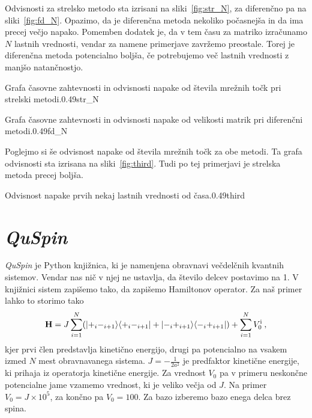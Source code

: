\documentclass{porocilo}
\begin{document}
Odvisnosti za strelsko metodo sta izrisani na sliki~\ref{fig:str_N}, za diferenčno pa na sliki~\ref{fig:fd_N}. Opazimo, da je diferenčna metoda nekoliko počasnejša in da ima precej večjo napako. Pomemben dodatek je, da v tem času za matriko izračunamo $N$ lastnih vrednosti, vendar za namene primerjave zavržemo preostale. Torej je diferenčna metoda potencialno boljša, če potrebujemo več lastnih vrednosti z manjšo natančnostjo.

\begin{multifig}{2}{Grafa časovne zahtevnosti in odvisnosti napake od števila mrežnih točk pri strelski metodi.}{0.49}{str_N}
\end{multifig}

\begin{multifig}{2}{Grafa časovne zahtevnosti in odvisnosti napake od velikosti matrik pri diferenčni metodi.}{0.49}{fd_N}
\end{multifig}

Poglejmo si še odvisnost napake od števila mrežnih točk za obe metodi. Ta grafa odvisnosti sta izrisana na sliki~\ref{fig:third}. Tudi po tej primerjavi je strelska metoda precej boljša.

\begin{multifig}{2}{Odvisnost napake prvih nekaj lastnih vrednosti od časa.}{0.49}{third}
\end{multifig}

\section{\textit{QuSpin}}
\textit{QuSpin} je Python knjižnica, ki je namenjena obravnavi večdelčnih kvantnih sistemov. Vendar nas nič v njej ne ustavlja, da število delcev postavimo na 1. V knjižnici sistem zapišemo tako, da zapišemo Hamiltonov operator. Za naš primer lahko to storimo tako
\begin{equation*}
    \mathbf{H} = J \sum_{i = 1}^{N} (|{+}_{i}{-}_{i+1}\rangle\langle{+}_{i}{-}_{i+1}| + |{-}_{i}{+}_{i+1}\rangle\langle{-}_{i}{+}_{i+1}|) + \sum_{i = 1}^{N} V_0^{\rm i} \>,
\end{equation*}
kjer prvi člen predstavlja kinetično energijo, drugi pa potencialno na vsakem izmed $N$ mest obravnavanega sistema. $J = -\tfrac{1}{2 a^2}$ je predfaktor kinetične energije, ki prihaja iz operatorja kinetične energije. Za vrednost $V_0$ pa v primeru neskončne potencialne jame vzamemo vrednost, ki je veliko večja od $J$. Na primer $V_0 = J \times 10^5$, za končno pa $V_0 = 100$. Za bazo izberemo bazo enega delca brez spina.
\end{document}
